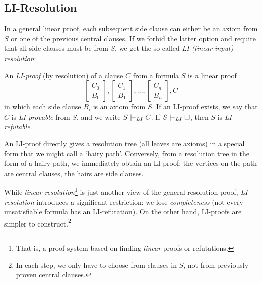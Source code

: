 

\subsection{LI-Resolution}

In a general linear proof, each subsequent side clause can either be an axiom from $S$ or one of the previous central clauses. If we forbid the latter option and require that all side clauses must be from $S$, we get the so-called \emph{LI (linear-input) resolution}:
    
\begin{definition}[LI-Proof]
    An \emph{LI-proof} (by resolution) of a clause $C$ from a formula $S$ is a linear proof 
    $$
    \begin{bmatrix}
        C_0 \\
        B_0
    \end{bmatrix},
    \begin{bmatrix}
        C_1 \\
        B_1
    \end{bmatrix},\dots,
    \begin{bmatrix}
        C_n \\
        B_n
    \end{bmatrix},
    C
    $$
    in which each side clause $B_i$ is an axiom from $S$. If an LI-proof exists, we say that $C$ is \emph{LI-provable} from $S$, and we write $S\proves_{LI}C$. If $S\proves_{LI}\square$, then $S$ is \emph{LI-refutable}.
\end{definition}

\begin{remark}
    An LI-proof directly gives a resolution tree (all leaves are axioms) in a special form that we might call a `hairy path'. Conversely, from a resolution tree in the form of a hairy path, we immediately obtain an LI-proof: the vertices on the path are central clauses, the hairs are side clauses.
\end{remark}

While \emph{linear resolution}\footnote{That is, a proof system based on finding \emph{linear} proofs or refutations.} is just another view of the general resolution proof, \emph{LI-resolution} introduces a significant restriction: we lose \emph{completeness} (not every unsatisfiable formula has an LI-refutation). On the other hand, LI-proofs are simpler to construct.\footnote{In each step, we only have to choose from clauses in $S$, not from previously proven central clauses.} 

